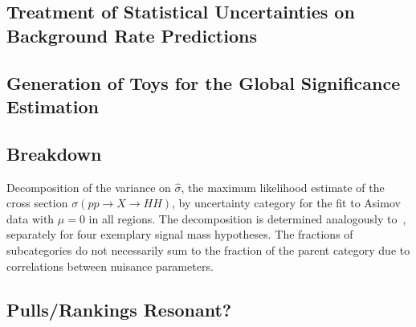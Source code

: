 \subsection{Treatment of Statistical Uncertainties on Background Rate
  Predictions}%
\label{sec:barlow_beeston}



\clearpage
\subsection{Generation of Toys for the Global Significance Estimation}%
\label{app:toy_generation}



\clearpage
\subsection{Breakdown}%
\label{app:breakdown_table}

\begin{table}[htbp]
  \centering

  \caption{Decomposition of the variance on $\hat{\sigma}$, the
    maximum likelihood estimate of the cross section
    $\sigma(pp \to X\to HH)$, by uncertainty category for the fit to
    Asimov data with $\mu = 0$ in all regions. The decomposition is
    determined analogously to~, separately
    for four exemplary signal mass hypotheses. The fractions of
    subcategories do not necessarily sum to the fraction of the parent
    category due to correlations between nuisance parameters.}%
  \label{tab:breakdown_res_exp_mu0}

  
\end{table}


\clearpage
\subsection{Pulls/Rankings Resonant?}%
\label{app:rankings_resonant}




